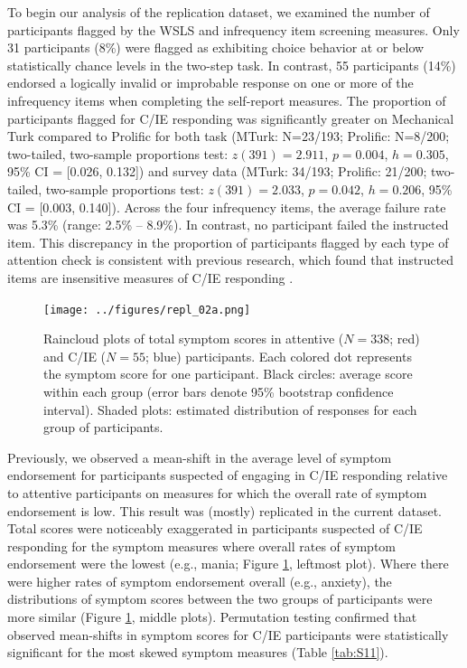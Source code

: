 \documentclass[a4paper,notitlepage,12pt]{article}
\begin{document}
To begin our analysis of the replication dataset, we examined the number of participants flagged by the WSLS and infrequency item screening measures. Only 31 participants (8\%) were flagged as exhibiting choice behavior at or below statistically chance levels in the two-step task. In contrast, 55 participants (14\%) endorsed a logically invalid or improbable response on one or more of the infrequency items when completing the self-report measures. The proportion of participants flagged for C/IE responding was significantly greater on Mechanical Turk compared to Prolific for both task (MTurk: N=23/193; Prolific: N=8/200; two-tailed, two-sample proportions test: $z(391)=2.911$, $p=0.004$, $h=0.305$, 95\% CI = [0.026, 0.132]) and survey data (MTurk: 34/193; Prolific: 21/200; two-tailed, two-sample proportions test: $z(391)= 2.033$, $p=0.042$, $h=0.206$, 95\% CI = [0.003, 0.140]). Across the four infrequency items, the average failure rate was 5.3\% (range: 2.5\% -- 8.9\%). In contrast, no participant failed the instructed item. This discrepancy in the proportion of participants flagged by each type of attention check is consistent with previous research, which found that instructed items are insensitive measures of C/IE responding \cite{barends2019noncompliant-2, thomas2017validity-2, hauser2016attentive-2}.   

\begin{figure}[t!]
    \texttt{[image: ../figures/repl\_02a.png]}
    \centering
    \caption{Raincloud plots of total symptom scores in attentive ($N=338$; red) and C/IE ($N=55$; blue) participants. Each colored dot represents the symptom score for one participant. Black circles: average score within each group (error bars denote 95\% bootstrap confidence interval). Shaded plots: estimated distribution of responses for each group of participants.}
    \label{fig:S07}
\end{figure}

Previously, we observed a mean-shift in the average level of symptom endorsement for participants suspected of engaging in C/IE responding relative to attentive participants on measures for which the overall rate of symptom endorsement is low. This result was (mostly) replicated in the current dataset. Total scores were noticeably exaggerated in participants suspected of C/IE responding for the symptom measures where overall rates of symptom endorsement were the lowest (e.g., mania; Figure \ref{fig:S07}, leftmost plot). Where there were higher rates of symptom endorsement overall (e.g., anxiety), the distributions of symptom scores between the two groups of participants were more similar (Figure \ref{fig:S07}, middle plots). Permutation testing confirmed that observed mean-shifts in symptom scores for C/IE participants were statistically significant for the most skewed symptom measures (Table \ref{tab:S11}).
\end{document}
